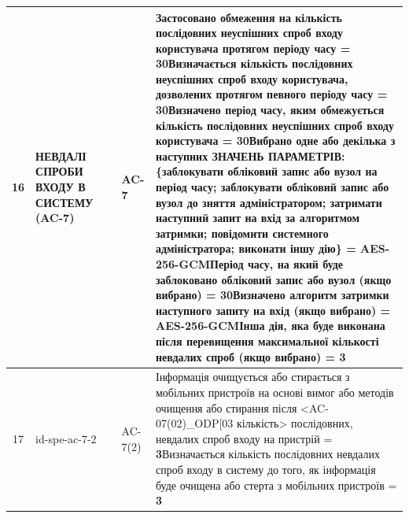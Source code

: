 \documentclass[10pt]{article}
\begin{document}
\begin{longtable}{|c|>{\raggedright\arraybackslash}p{2.5cm}|>{\raggedright\arraybackslash}p{4.5cm}|>{\raggedright\arraybackslash}p{3cm}|>{\raggedright\arraybackslash}p{4.5cm}|}
16 & НЕВДАЛІ СПРОБИ ВХОДУ В СИСТЕМУ (AC-7) &  & AC-7 & Застосовано обмеження на кількість послідовних неуспішних спроб входу користувача протягом періоду часу = \textbf{30}\newline Визначається кількість послідовних неуспішних спроб входу користувача, дозволених протягом певного періоду часу = \textbf{30}\newline Визначено період часу, яким обмежується кількість послідовних неуспішних спроб входу користувача = \textbf{30}\newline Вибрано одне або декілька з наступних ЗНАЧЕНЬ ПАРАМЕТРІВ: \{заблокувати обліковий запис або вузол на період часу; заблокувати обліковий запис або вузол до зняття адміністратором; затримати наступний запит на вхід за алгоритмом затримки; повідомити системного адміністратора; виконати іншу дію\} = \textbf{AES-256-GCM}\newline Період часу, на який буде заблоковано обліковий запис або вузол (якщо вибрано) = \textbf{30}\newline Визначено алгоритм затримки наступного запиту на вхід (якщо вибрано) = \textbf{AES-256-GCM}\newline Інша дія, яка буде виконана після перевищення максимальної кількості невдалих спроб (якщо вибрано) = \textbf{3} \\ \hline
17 & id-spe-ac-7-2 &  & AC-7(2) & Інформація очищується або стирається з мобільних пристроїв на основі вимог або методів очищення або стирання після <AC-07(02)\_\allowbreak{}ODP[03 кількість> послідовних, невдалих спроб входу на пристрій = \textbf{3}\newline Визначається кількість послідовних невдалих спроб входу в систему до того, як інформація буде очищена або стерта з мобільних пристроїв = \textbf{3} \\ \hline

\end{longtable}
\end{document}
